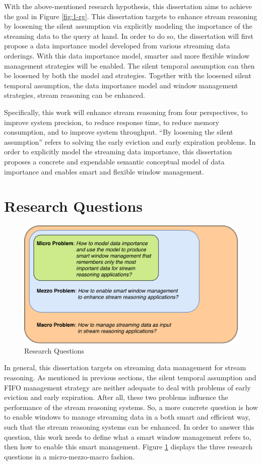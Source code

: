 With the above-mentioned research hypothesis, this dissertation aims to achieve the goal in Figure \ref{fig:1-rg}.
This dissertation targets to enhance stream reasoning by loosening the silent assumption via explicitly modeling the importance of the streaming data to the query at hand.
In order to do so, the dissertation will first propose a data importance model developed from various streaming data orderings. 
With this data importance model, smarter and more flexible window management strategies will be enabled. 
The silent temporal assumption can then be loosened by both the model and strategies.
Together with the loosened silent temporal assumption, the data importance model and window management strategies, stream reasoning can be enhanced. 

Specifically, this work will enhance stream reasoning from four perspectives, to improve system precision, to reduce response time, to reduce memory consumption, and to improve system throughput. 
``By loosening the silent assumption'' refers to solving the early eviction and early expiration problems. 
In order to explicitly model the streaming data importance, this dissertation proposes a concrete and expendable semantic conceptual model of data importance and enables smart and flexible window management. 
%
\section{Research Questions}

\begin{figure}[!htbp]
	\centering
	\includegraphics[width=5in]{img/1-rq.pdf}
	\caption{Research Questions}
	\label{fig:1-rq} 
\end{figure}

In general, this dissertation targets on streaming data management for stream reasoning. 
As mentioned in previous sections, the silent temporal assumption and FIFO management strategy are neither adequate to deal with problems of early eviction and early expiration. 
After all, these two problems influence the performance of the stream reasoning systems. 
So, a more concrete question is how to enable windows to manage streaming data in a both smart and efficient way, such that the stream reasoning systems can be enhanced. 
In order to answer this question, this work needs to define what a smart window management refers to, then how to enable this smart management. 
Figure \ref{fig:1-rq} displays the three research questions in a micro-mezzo-macro \cite{lacasse2015making} fashion.

